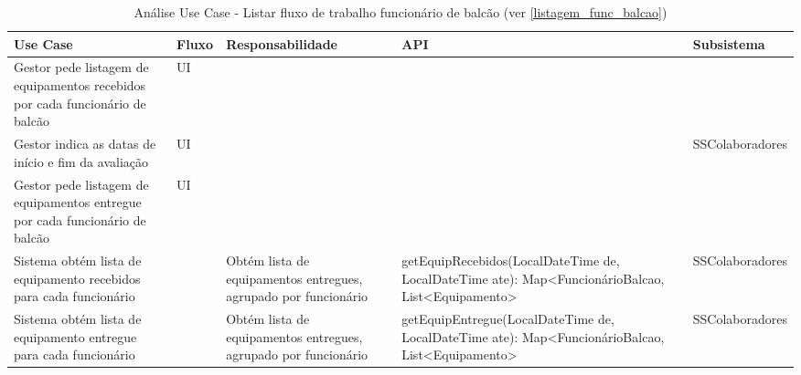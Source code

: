 \documentclass[../relatorio.tex]{subfiles}
\begin{document}
\begin{landscape}
    \begin{table}[!h]
        \centering
        \begin{tabular}{|p{5cm}|p{1cm}|p{4cm}|p{6cm}|p{4cm}|}
            \hline
            \rowcolor{gray!20!white}
            Use Case & Fluxo & Responsabilidade & API & Subsistema \\
            \hline
            \rowcolor{yellow}
            Gestor pede listagem de equipamentos recebidos por cada funcionário de balcão
                     &
            UI
                     &
                     &
                     &
            \\
            \hline
            \rowcolor{yellow}
            Gestor indica as datas de início e fim da avaliação
                     &
            UI
                     &
                     &
                     &
            SSColaboradores
            \\
            \hline
            Gestor pede listagem de equipamentos entregue por cada funcionário de balcão
                     &
            UI
                     &
                     &
                     &
            \\
            \hline
            Sistema obtém lista de equipamento recebidos para cada funcionário
                     &
                     &
            Obtém lista de equipamentos entregues, agrupado por funcionário
                     &
            getEquipRecebidos(LocalDateTime de, LocalDateTime ate): Map<FuncionárioBalcao, List<Equipamento>
                     &
            SSColaboradores
            \\
            \hline
            Sistema obtém lista de equipamento entregue para cada funcionário
                     &
                     &
            Obtém lista de equipamentos entregues, agrupado por funcionário
                     &
            getEquipEntregue(LocalDateTime de, LocalDateTime ate): Map<FuncionárioBalcao, List<Equipamento>
                     &
            SSColaboradores
            \\
            \hline
        \end{tabular}
        \caption{Análise Use Case - Listar fluxo de trabalho funcionário de balcão (ver \ref{listagem_func_balcao})}
    \end{table}
\end{landscape}
\end{document}
